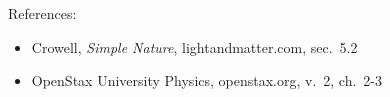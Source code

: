 References:
\begin{itemize}
\item Crowell, \emph{Simple Nature}, lightandmatter.com, sec.~5.2
\item OpenStax University Physics, openstax.org, v.~2, ch.~2-3
\end{itemize}
